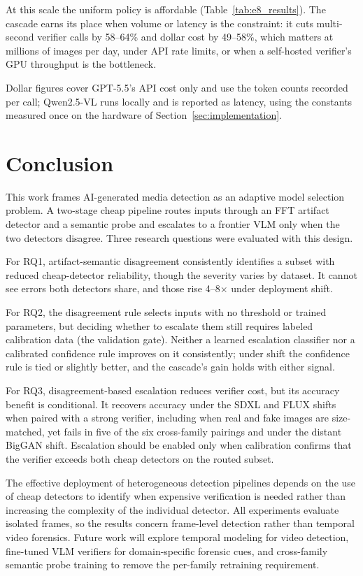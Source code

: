 \documentclass{ieeeaccess}
\begin{document}
At this scale the uniform policy is affordable (Table~\ref{tab:e8_results}). The cascade earns its place when volume or latency is the constraint: it cuts multi-second verifier calls by 58--64\% and dollar cost by 49--58\%, which matters at millions of images per day, under API rate limits, or when a self-hosted verifier's GPU throughput is the bottleneck.

Dollar figures cover GPT-5.5's API cost only and use the token counts recorded per call; Qwen2.5-VL runs locally and is reported as latency, using the constants measured once on the hardware of Section~\ref{sec:implementation}.

\section{Conclusion}

This work frames AI-generated media detection as an adaptive model selection problem. A two-stage cheap pipeline routes inputs through an FFT artifact detector and a semantic probe and escalates to a frontier VLM only when the two detectors disagree. Three research questions were evaluated with this design.

For RQ1, artifact-semantic disagreement consistently identifies a subset with reduced
cheap-detector reliability, though the severity varies by dataset. It cannot see errors
both detectors share, and those rise 4--8$\times$ under deployment shift.

For RQ2, the disagreement rule selects inputs with no threshold or trained parameters, but deciding whether to escalate them still requires labeled calibration data (the validation gate). Neither a learned escalation classifier nor a calibrated confidence rule improves on it consistently; under shift the confidence rule is tied or slightly better, and the cascade's gain holds with either signal.

For RQ3, disagreement-based escalation reduces verifier cost, but its accuracy benefit is
conditional. It recovers accuracy under the SDXL and FLUX shifts when paired with a
strong verifier, including when real and fake images are size-matched, yet fails in five of the six cross-family pairings and under the distant BigGAN shift.
Escalation should be enabled only when calibration confirms that the verifier exceeds
both cheap detectors on the routed subset.

The effective deployment of heterogeneous detection pipelines depends on the use of cheap detectors to identify when expensive verification is needed rather than increasing the complexity of the individual detector. All experiments evaluate isolated frames, so the results concern frame-level detection rather than temporal video forensics. Future work will explore temporal modeling for video detection, fine-tuned VLM verifiers for domain-specific forensic cues, and cross-family semantic probe training to remove the per-family retraining requirement.
\end{document}
